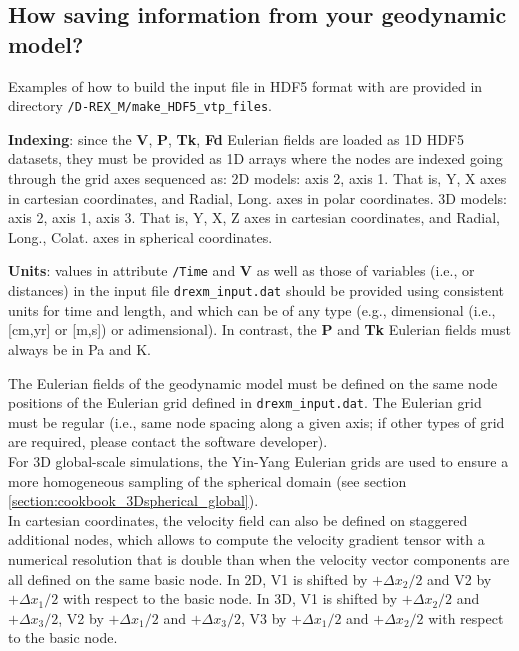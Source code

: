 \subsection{How saving information from your geodynamic model?}
Examples of how to build the input file in HDF5 format with \matlabtitle{} are provided in directory \texttt{/D-REX\_M/make\_HDF5\_vtp\_files}.

\textbf{Indexing}: since the \textbf{V}, \textbf{P}, \textbf{Tk}, \textbf{Fd} Eulerian fields are loaded as 1D HDF5 datasets, they must be provided as 1D arrays where the nodes are indexed going through the grid axes sequenced as:
2D models: axis 2, axis 1. That is, Y, X axes in cartesian coordinates, and Radial, Long. axes in polar coordinates.
3D models: axis 2, axis 1, axis 3. That is, Y, X, Z axes in cartesian coordinates, and  Radial, Long., Colat. axes in spherical coordinates. 

\textbf{Units}: values in attribute \texttt{/Time} and \textbf{V} as well as those of variables (i.e.,  or distances) in the input file \texttt{drexm\_input.dat} should be provided using consistent units for time and length, and which can be of any type (e.g., dimensional (i.e., [cm,yr] or [m,s]) or adimensional). In contrast, the \textbf{P} and \textbf{Tk} Eulerian fields must always be in Pa and K.

The Eulerian fields of the geodynamic model must be defined on the same node positions of the Eulerian grid defined in \texttt{drexm\_input.dat}. The Eulerian grid must be regular (i.e., same node spacing along a given axis; if other types of grid are required, please contact the software developer).\\
For 3D global-scale simulations, the Yin-Yang Eulerian grids \citep{kageyama2004g3} are used to ensure a more homogeneous sampling of the spherical domain (see section \ref{section:cookbook_3Dspherical_global}).\\ 
In cartesian coordinates, the velocity field can also be defined on staggered additional nodes, which allows to compute the velocity gradient tensor with a numerical resolution that is double than when the velocity vector components are all defined on the same basic node.  
In 2D, V1 is shifted by $+\Delta x_2/2$ and V2 by $+\Delta x_1/2$ with respect to the basic node. 
In 3D, V1 is shifted by $+\Delta x_2/2$ and $+\Delta x_3/2$, V2 by $+\Delta x_1/2$ and $+\Delta x_3/2$, V3 by $+\Delta x_1/2$ and $+\Delta x_2/2$ with respect to the basic node.

